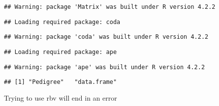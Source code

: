 \begin{verbatim}
## Warning: package 'Matrix' was built under R version 4.2.2
\end{verbatim}

\begin{verbatim}
## Loading required package: coda
\end{verbatim}

\begin{verbatim}
## Warning: package 'coda' was built under R version 4.2.2
\end{verbatim}

\begin{verbatim}
## Loading required package: ape
\end{verbatim}

\begin{verbatim}
## Warning: package 'ape' was built under R version 4.2.2
\end{verbatim}

\begin{Shaded}
\begin{Highlighting}[]
\OtherTok{\textless{}{-}} \NormalTok{(} \NormalTok{, } \NormalTok{, }
                          \NormalTok{, } \NormalTok{)}
\OtherTok{\textless{}{-}}\NormalTok{ ped0[ , }\NormalTok{(}\NormalTok{,}\NormalTok{,}\NormalTok{)]}
\OtherTok{\textless{}{-}} \NormalTok{(}\NormalTok{, }\NormalTok{, }\NormalTok{)}
\NormalTok{) }
\end{Highlighting}
\end{Shaded}

\begin{verbatim}
## [1] "Pedigree"   "data.frame"
\end{verbatim}

Trying to use rbv will end in an error

\begin{Shaded}
\begin{Highlighting}[]
\OtherTok{\textless{}{-}} \NormalTok{)}
\end{Highlighting}
\end{Shaded}

